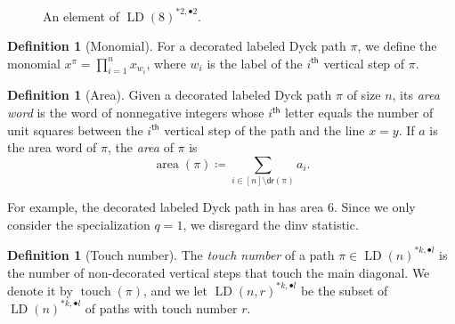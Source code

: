 \documentclass[reqno]{amsart}
\theoremstyle{plain}
\theoremstyle{definition}
\newtheorem{definition}[theorem]{Definition}
\theoremstyle{remark}
\renewcommand{\th}{^\mathsf{th}}
\DeclareMathOperator{\LD}{LD}
\DeclareMathOperator{\area}{area}
\DeclareMathOperator{\touch}{touch}
\newcommand{\<}{\langle}
\renewcommand{\>}{\rangle}
\begin{document}
\begin{figure}
    \centering
    \caption{An element of $\LD(8)^{\ast 2, \bullet 2}$.}
    \label{fig:path-example}
\end{figure}

\begin{definition}[Monomial]
    \label{def:monomial}
    For a decorated labeled Dyck path $\pi$, we define the monomial $x^\pi = \prod_{i=1}^n x_{w_i}$, where $w_i$ is the label of the $i\th$ vertical step of $\pi$.
\end{definition}

\begin{definition}[Area]
    \label{def:area}
    Given a decorated labeled Dyck path $\pi$ of size $n$, its \emph{area word} is the word of nonnegative integers whose $i\th$ letter equals the number of unit squares between the $i\th$ vertical step of the path and the line $x=y$. If $a$ is the area word of $\pi$, the \emph{area} of $\pi$ is \[\area(\pi) \coloneqq \sum_{i \in [n] \setminus \mathsf{dr}(\pi)} a_i.\]
\end{definition}

For example, the decorated labeled Dyck path in  has area $6$. Since we only consider the specialization $q=1$, we disregard the dinv statistic.

\begin{definition}[Touch number]
    The \emph{touch number} of a path $\pi \in \LD(n)^{\ast k, \bullet l}$ is the number of non-decorated vertical steps that touch the main diagonal. We denote it by $\touch(\pi)$, and we let $\LD(n,r)^{\ast k, \bullet l}$ be the subset of $\LD(n)^{\ast k, \bullet l}$ of paths with touch number $r$.
\end{definition}
\end{document}
